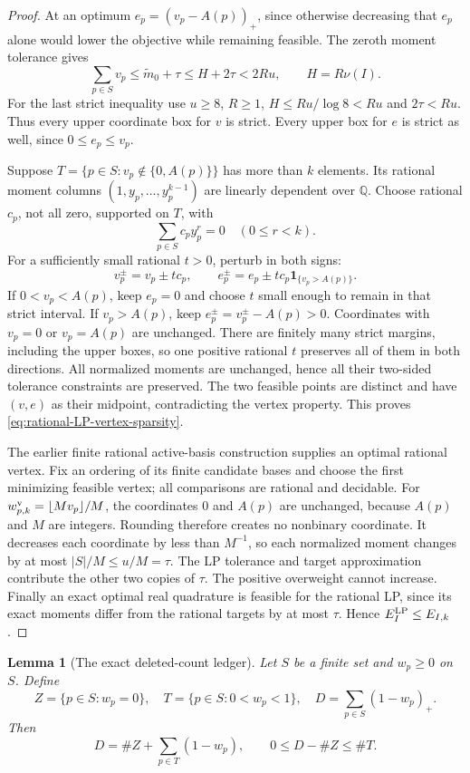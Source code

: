 \documentclass[11pt]{article}
\newtheorem{lemma}[theorem]{Lemma}
\theoremstyle{definition}
\begin{document}
\begin{proof}
At an optimum $e_p=(v_p-A(p))_+$, since otherwise decreasing
that $e_p$ alone would lower the objective while remaining
feasible. The zeroth moment tolerance gives
\[
 \sum_{p\in S}v_p\le\widetilde m_0+\tau\le H+2\tau<2Ru,
 \qquad H=R\nu(I).
\]
For the last strict inequality use $u\ge8$, $R\ge1$,
$H\le Ru/\log8<Ru$ and $2\tau<Ru$.
Thus every upper coordinate box for $v$ is strict.
Every upper box for $e$ is strict as well, since
$0\le e_p\le v_p$.

Suppose $T=\{p\in S:v_p\notin\{0,A(p)\}\}$ has more than
$k$ elements. Its rational moment columns
$(1,y_p,\ldots,y_p^{k-1})$ are linearly dependent over
$\mathbb Q$. Choose rational $c_p$, not all zero, supported
on $T$, with
\[
 \sum_{p\in S}c_p y_p^r=0\quad(0\le r<k).
\]
For a sufficiently small rational $t>0$, perturb in both signs:
\[
 v_p^\pm=v_p\pm tc_p,\qquad
 e_p^\pm=e_p\pm tc_p\boldsymbol1_{\{v_p>A(p)\}}.
\]
If $0<v_p<A(p)$, keep $e_p=0$ and choose $t$ small enough
to remain in that strict interval. If $v_p>A(p)$, keep
$e_p^\pm=v_p^\pm-A(p)>0$. Coordinates with $v_p=0$ or
$v_p=A(p)$ are unchanged. There are finitely many strict
margins, including the upper boxes, so one positive rational
$t$ preserves all of them in both directions.
All normalized moments are unchanged, hence all their
two-sided tolerance constraints are preserved.
The two feasible points are distinct and have $(v,e)$ as
their midpoint, contradicting the vertex property.
This proves \eqref{eq:rational-LP-vertex-sparsity}.

The earlier finite rational active-basis construction supplies
an optimal rational vertex. Fix an ordering of its finite
candidate bases and choose the first minimizing feasible
vertex; all comparisons are rational and decidable.
For $w^{\rm v}_{p,k}=\lfloor Mv_p\rfloor/M$, the coordinates
$0$ and $A(p)$ are unchanged, because $A(p)$ and $M$ are
integers. Rounding therefore creates no nonbinary coordinate.
It decreases each coordinate by less than $M^{-1}$, so each
normalized moment changes by at most $|S|/M\le u/M=\tau$.
The LP tolerance and target approximation contribute the
other two copies of $\tau$.
The positive overweight cannot increase.
Finally an exact optimal real quadrature is feasible for
the rational LP, since its exact moments differ from the
rational targets by at most $\tau$. Hence
$E_I^{\rm LP}\le E_{I,k}$.
\end{proof}

\begin{lemma}[The exact deleted-count ledger]
\label{lem:deleted-count-deficit-ledger}
Let $S$ be a finite set and $w_p\ge0$ on $S$. Define
\[
 Z=\{p\in S:w_p=0\},\quad T=\{p\in S:0<w_p<1\},\quad
 D=\sum_{p\in S}(1-w_p)_+.
\]
Then
\begin{equation}
 D=\#Z+\sum_{p\in T}(1-w_p),\qquad
                  0\le D-\#Z\le\#T .
 \label{eq:deleted-count-deficit-ledger}
\end{equation}
\end{lemma}
\end{document}
